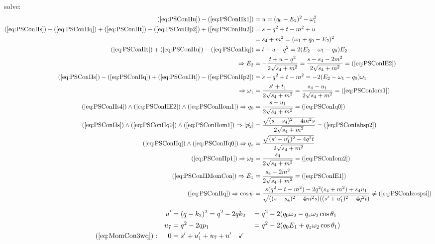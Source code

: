 solve:
\begin{align}
(\ref{eq:PSConIIu})-(\ref{eq:PSConIIk1}) &= u=(q_0-E_2)^2-\omega_1^2 \label{eq:PSConIIu2}\\
(\ref{eq:PSConIIs}) - (\ref{eq:PSConIIq}) + (\ref{eq:PSConIIt}) - (\ref{eq:PSConIIp2}) + (\ref{eq:PSConIIu2}) &= s-q^2+t-m^2+u\\
 &= s_4+m^2 = (\omega_1+q_0-E_2)^2 \label{eq:PSConIIs4}\\
(\ref{eq:PSConIIt}) + (\ref{eq:PSConIIu}) - (\ref{eq:PSConIIq}) &= t+u-q^2 = 2(E_2-\omega_1-q_0)E_2\\
\Rightarrow E_2 &= -\frac{t+u-q^2}{2\sqrt{s_4+m^2}} =\frac{s-s_4-2m^2}{2\sqrt{s_4+m^2}} = (\ref{eq:PSConIE2}) \label{eq:PSConIIE2}\\
(\ref{eq:PSConIIs}) - (\ref{eq:PSConIIq}) + (\ref{eq:PSConIIt}) - (\ref{eq:PSConIIp2}) &= s-q^2+t-m^2 = -2(E_2-\omega_1-q_0)\omega_1\\
\Rightarrow \omega_1 &= \frac{s'+t_1}{2\sqrt{s_4+m^2}} =\frac{s_4-u_1}{2\sqrt{s_4+m^2}} = (\ref{eq:PSConIom1}) \label{eq:PSConIIom1}\\
(\ref{eq:PSConIIs4}) \land (\ref{eq:PSConIIE2}) \land (\ref{eq:PSConIIom1}) \Rightarrow q_0 &= \frac{s+u_1}{2\sqrt{s_4+m^2}} = (\ref{eq:PSConIq0}) \label{eq:PSConIIq0}\\
(\ref{eq:PSConIIs}) \land (\ref{eq:PSConIIq0}) \land (\ref{eq:PSConIIom1}) \Rightarrow \left|\vec p_2\right| &= \frac{\sqrt{(s-s_4)^2-4m^2 s}}{2\sqrt{s_4+m^2}} = (\ref{eq:PSConIabsp2}) \label{eq:PSConIIabsp2}\\
(\ref{eq:PSConIIq}) \land (\ref{eq:PSConIIq0}) \Rightarrow q_z &= \frac{\sqrt{(s'+u_1')^2-4q^2t}}{2\sqrt{s_4+m^2}} \label{eq:PSConIIqz}\\
(\ref{eq:PSConIIp1}) \Rightarrow \omega_2 &= \frac{s_4}{2\sqrt{s_4+m^2}} = (\ref{eq:PSConIom2}) \label{eq:PSConIIom2}\\
(\ref{eq:PSConIIMomCon}) \Rightarrow E_1 &= \frac{s_4+2m^2}{2\sqrt{s_4+m^2}} = (\ref{eq:PSConIE1}) \label{eq:PSConIIE1}\\
(\ref{eq:PSConIIq}) \Rightarrow \cos\psi &= \frac{s(q^2-t-m^2)- 2q^2(s_4+m^2)+s_4 u_1}{\sqrt{((s-s_4)^2-4m^2s)((s'+u_1')^2-4q^2 t)}} \neq (\ref{eq:PSConIcospsi}) \label{eq:PSConIIcospsi}
\end{align}

\begin{align}
&&u' &=(q-k_2)^2 = q^2-2qk_2 &&= q^2-2(q_0\omega_2 -q_z\omega_2\cos\theta_1\\
&&u_7 &= q^2-2qp_1 &&=q^2 - 2(q_0E_1 +q_z\omega_2\cos\theta_1)\\
(\ref{eq:MomCon3wq}): &&0 &=s'+u_1'+u_7+u'\quad\checkmark
\end{align}

